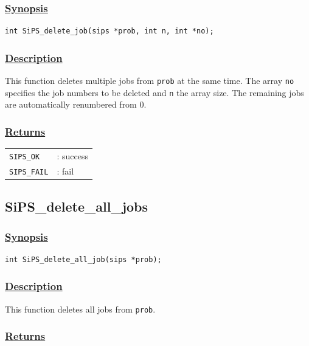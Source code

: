 \documentclass[a4paper]{book}
\begin{document}
\subsubsection{\underline{Synopsis}}

\begin{verbatim}
int SiPS_delete_job(sips *prob, int n, int *no);
\end{verbatim}

\subsubsection{\underline{Description}}

This function deletes multiple jobs from \verb+prob+ at the same time.
The array \verb+no+ specifies the job numbers to be deleted and \verb+n+ the array size.
The remaining jobs are automatically renumbered from $0$.

\subsubsection{\underline{Returns}}

\begin{tabular}{ll}
  \verb+SIPS_OK+  &: success\\
  \verb+SIPS_FAIL+&: fail\\
\end{tabular}

\hypertarget{SiPS_delete_all_jobs}{%
\subsection{SiPS\_delete\_all\_jobs}
}

\subsubsection{\underline{Synopsis}}

\begin{verbatim}
int SiPS_delete_all_job(sips *prob);
\end{verbatim}

\subsubsection{\underline{Description}}

This function deletes all jobs from \verb+prob+.

\subsubsection{\underline{Returns}}
\end{document}
